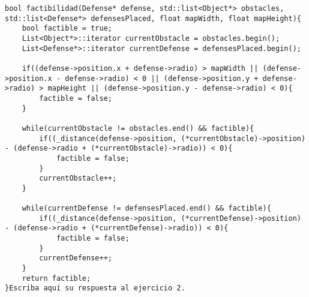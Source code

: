 \begin{lstlisting}
bool factibilidad(Defense* defense, std::list<Object*> obstacles, std::list<Defense*> defensesPlaced, float mapWidth, float mapHeight){
    bool factible = true;
    List<Object*>::iterator currentObstacle = obstacles.begin();
    List<Defense*>::iterator currentDefense = defensesPlaced.begin();

    if((defense->position.x + defense->radio) > mapWidth || (defense->position.x - defense->radio) < 0 || (defense->position.y + defense->radio) > mapHeight || (defense->position.y - defense->radio) < 0){
        factible = false;
    }

    while(currentObstacle != obstacles.end() && factible){
        if((_distance(defense->position, (*currentObstacle)->position) - (defense->radio + (*currentObstacle)->radio)) < 0){
            factible = false;
        }
        currentObstacle++;
    }

    while(currentDefense != defensesPlaced.end() && factible){
        if((_distance(defense->position, (*currentDefense)->position) - (defense->radio + (*currentDefense)->radio)) < 0){
            factible = false;
        }
        currentDefense++;
    }
    return factible;
}Escriba aquí su respuesta al ejercicio 2.
\end{lstlisting}
